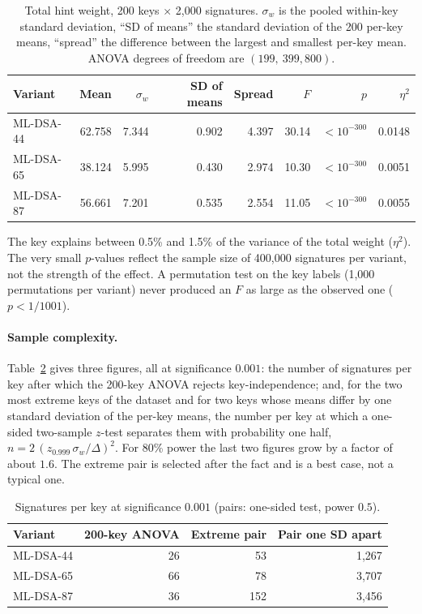 \documentclass{article}
\begin{document}
\begin{table}[h!]
\centering
\caption{Total hint weight, 200 keys $\times$ 2,000 signatures.  $\sigma_w$ is
the pooled within-key standard deviation, ``SD of means'' the standard
deviation of the 200 per-key means, ``spread'' the difference between the
largest and smallest per-key mean.  ANOVA degrees of freedom are
$(199,\ 399{,}800)$.}
\label{tab:l1}
\begin{tabular}{lrrrrrrr}
\toprule
\textbf{Variant} & \textbf{Mean} & $\sigma_w$ & \textbf{SD of means} &
\textbf{Spread} & $F$ & $p$ & $\eta^2$ \\
\midrule
ML-DSA-44 & 62.758 & 7.344 & 0.902 & 4.397 & 30.14 & $< 10^{-300}$ & 0.0148 \\
ML-DSA-65 & 38.124 & 5.995 & 0.430 & 2.974 & 10.30 & $< 10^{-300}$ & 0.0051 \\
ML-DSA-87 & 56.661 & 7.201 & 0.535 & 2.554 & 11.05 & $< 10^{-300}$ & 0.0055 \\
\bottomrule
\end{tabular}
\end{table}

The key explains between 0.5\% and 1.5\% of the variance of the total weight
($\eta^2$).  The very small $p$-values reflect the sample size of 400,000
signatures per variant, not the strength of the effect.  A permutation test on
the key labels (1,000 permutations per variant) never produced an $F$ as large
as the observed one ($p < 1/1001$).

\paragraph{Sample complexity.}
Table~\ref{tab:samples} gives three figures, all at significance $0.001$:
the number of signatures per key after which the 200-key ANOVA rejects
key-independence; and, for the two most extreme keys of the dataset and for two
keys whose means differ by one standard deviation of the per-key means, the
number per key at which a one-sided two-sample $z$-test separates them with
probability one half, $n = 2\,(z_{0.999}\,\sigma_w/\Delta)^2$.  For 80\% power
the last two figures grow by a factor of about $1.6$.  The
extreme pair is selected after the fact and is a best case, not a typical one.

\begin{table}[h!]
\centering
\caption{Signatures per key at significance $0.001$ (pairs: one-sided test, power $0.5$).}
\label{tab:samples}
\begin{tabular}{lrrr}
\toprule
\textbf{Variant} & \textbf{200-key ANOVA} & \textbf{Extreme pair} &
\textbf{Pair one SD apart} \\
\midrule
ML-DSA-44 & 26 & 53  & 1{,}267 \\
ML-DSA-65 & 66 & 78  & 3{,}707 \\
ML-DSA-87 & 36 & 152 & 3{,}456 \\
\bottomrule
\end{tabular}
\end{table}
\end{document}
